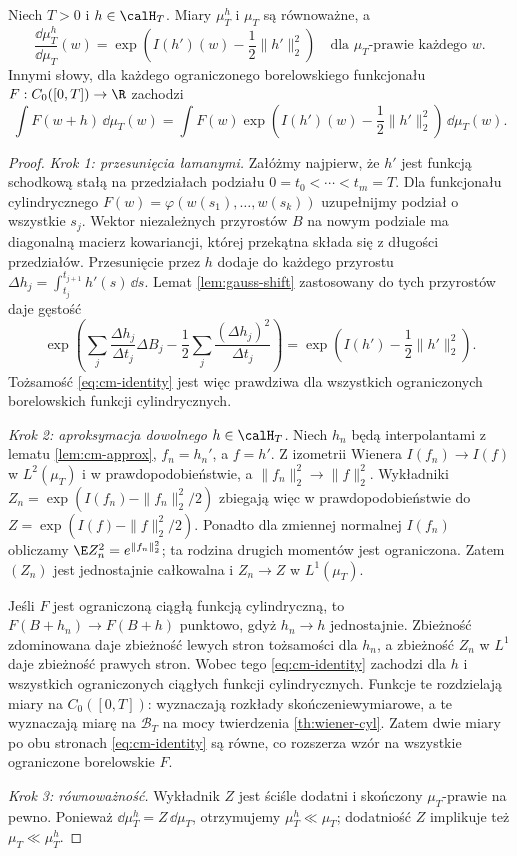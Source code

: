\begin{twierdzenie}
\label{th:cameron-martin}
Niech $T>0$ i $h\in\calH_T$.
Miary $\mu_T^h$ i $\mu_T$ są równoważne, a
\[
\frac{\dd\mu_T^h}{\dd\mu_T}(w)
=\exp\left(I(h')(w)-\frac12\|h'\|_2^2\right)
\quad\text{dla }\mu_T\text{-prawie każdego }w.
\tag{9.1}\label{eq:cm-density}
\]
Innymi słowy, dla każdego ograniczonego borelowskiego
funkcjonału $F:C_0([0,T])\to\R$ zachodzi
\[
\int F(w+h)\,\dd\mu_T(w)
=\int F(w)\exp\left(I(h')(w)-\frac12\|h'\|_2^2\right)
\,\dd\mu_T(w).
\tag{9.2}\label{eq:cm-identity}
\]
\end{twierdzenie}
\begin{proof}
\emph{Krok 1: przesunięcia łamanymi.} Załóżmy najpierw, że
$h'$ jest funkcją schodkową stałą na przedziałach podziału
$0=t_0<\cdots<t_m=T$. Dla funkcjonału cylindrycznego
$F(w)=\varphi(w(s_1),\ldots,w(s_k))$ uzupełnijmy podział
o wszystkie $s_j$. Wektor niezależnych przyrostów $B$ na
nowym podziale ma diagonalną macierz kowariancji, której
przekątna składa się z długości przedziałów.
Przesunięcie przez $h$ dodaje do każdego przyrostu
$\Delta h_j=\int_{t_j}^{t_{j+1}}h'(s)\,\dd s$.
Lemat \ref{lem:gauss-shift} zastosowany do tych przyrostów
daje gęstość
\[
\exp\left(\sum_j\frac{\Delta h_j}{\Delta t_j}\Delta B_j
 -\frac12\sum_j\frac{(\Delta h_j)^2}{\Delta t_j}\right)
=\exp\left(I(h')-\frac12\|h'\|_2^2\right).
\]
Tożsamość \eqref{eq:cm-identity} jest więc prawdziwa dla
wszystkich ograniczonych borelowskich funkcji cylindrycznych.

\emph{Krok 2: aproksymacja dowolnego $h\in\calH_T$.}
Niech $h_n$ będą interpolantami z lematu \ref{lem:cm-approx},
$f_n=h_n'$, a $f=h'$. Z izometrii Wienera
$I(f_n)\to I(f)$ w $L^2(\mu_T)$ i w prawdopodobieństwie,
a $\|f_n\|_2^2\to\|f\|_2^2$. Wykładniki
$Z_n=\exp(I(f_n)-\|f_n\|_2^2/2)$ zbiegają więc
w prawdopodobieństwie do
$Z=\exp(I(f)-\|f\|_2^2/2)$.
Ponadto dla zmiennej normalnej $I(f_n)$ obliczamy
$\E Z_n^2=e^{\|f_n\|_2^2}$; ta rodzina drugich
momentów jest ograniczona. Zatem $(Z_n)$ jest jednostajnie
całkowalna i $Z_n\to Z$ w $L^1(\mu_T)$.

Jeśli $F$ jest ograniczoną ciągłą funkcją cylindryczną,
to $F(B+h_n)\to F(B+h)$ punktowo, gdyż $h_n\to h$
jednostajnie. Zbieżność zdominowana daje zbieżność
lewych stron tożsamości dla $h_n$, a zbieżność $Z_n$
w $L^1$ daje zbieżność prawych stron.
Wobec tego \eqref{eq:cm-identity} zachodzi dla $h$ i
wszystkich ograniczonych ciągłych funkcji cylindrycznych.
Funkcje te rozdzielają miary na $C_0([0,T])$:
wyznaczają rozkłady skończeniewymiarowe, a te wyznaczają
miarę na $\mathcal B_T$ na mocy twierdzenia \ref{th:wiener-cyl}.
Zatem dwie miary po obu stronach \eqref{eq:cm-identity}
są równe, co rozszerza wzór na wszystkie ograniczone
borelowskie $F$.

\emph{Krok 3: równoważność.} Wykładnik $Z$ jest ściśle
dodatni i skończony $\mu_T$-prawie na pewno.
Ponieważ $\dd\mu_T^h=Z\,\dd\mu_T$, otrzymujemy
$\mu_T^h\ll\mu_T$; dodatniość $Z$ implikuje też
$\mu_T\ll\mu_T^h$.
\end{proof}

